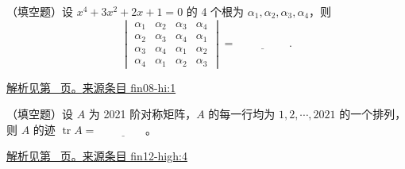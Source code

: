 \documentclass[12pt,fontset=fandol]{ctexart}
\begin{document}
\begin{example}\label{ex:fin08-hi:1}

（填空题）设 $x^{4}+3x^{2}+2x+1=0$ 的 4 个根为 $\alpha_{1},\alpha_{2},\alpha_{3},\alpha_{4}$，则
\[
\begin{vmatrix}
\alpha_{1} & \alpha_{2} & \alpha_{3} & \alpha_{4} \\
\alpha_{2} & \alpha_{3} & \alpha_{4} & \alpha_{1} \\
\alpha_{3} & \alpha_{4} & \alpha_{1} & \alpha_{2} \\
\alpha_{4} & \alpha_{1} & \alpha_{2} & \alpha_{3}
\end{vmatrix}=\underline{\hspace{2cm}}.
\]

\par\hyperref[ans:fin08-hi:1]{解析见第~\pageref{ans:fin08-hi:1} 页。}\quad\href{https://github.com/lzxcr/cmc-mathematics/blob/64916fa1fdbc3e444a652eca204d5669058ee321/src/problems/finals/08/01.md}{来源条目 fin08-hi:1}

\end{example}

\begin{example}\label{ex:fin12-high:4}

（填空题）设 $A$ 为 2021 阶对称矩阵，$A$ 的每一行均为 $1,2,\cdots,2021$ 的一个排列，则 $A$ 的迹 $\operatorname{tr} A=$ $\underline{\qquad\qquad}$。

\par\hyperref[ans:fin12-high:4]{解析见第~\pageref{ans:fin12-high:4} 页。}\quad\href{https://github.com/lzxcr/cmc-mathematics/blob/64916fa1fdbc3e444a652eca204d5669058ee321/src/problems/finals/12/04.md}{来源条目 fin12-high:4}

\end{example}
\end{document}
